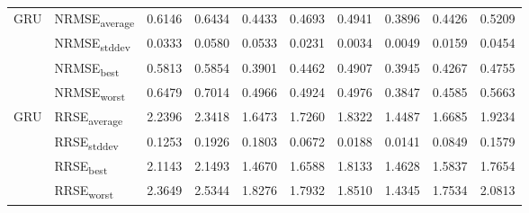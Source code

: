 {\begin{longtable}{l l c c c c c c c c}
\cmidrule(lr){2-10}
\multirow{4}{*}{GRU} & NRMSE\textsubscript{average} & 0.6146 & 0.6434 & 0.4433 & 0.4693 & 0.4941 & 0.3896 & 0.4426 & 0.5209 \\
 & NRMSE\textsubscript{stddev} & 0.0333 & 0.0580 & 0.0533 & 0.0231 & 0.0034 & 0.0049 & 0.0159 & 0.0454 \\
 & NRMSE\textsubscript{best} & 0.5813 & 0.5854 & 0.3901 & 0.4462 & 0.4907 & 0.3945 & 0.4267 & 0.4755 \\
 & NRMSE\textsubscript{worst} & 0.6479 & 0.7014 & 0.4966 & 0.4924 & 0.4976 & 0.3847 & 0.4585 & 0.5663 \\
\cmidrule(lr){2-10}
\multirow{4}{*}{GRU} & RRSE\textsubscript{average} & 2.2396 & 2.3418 & 1.6473 & 1.7260 & 1.8322 & 1.4487 & 1.6685 & 1.9234 \\
 & RRSE\textsubscript{stddev} & 0.1253 & 0.1926 & 0.1803 & 0.0672 & 0.0188 & 0.0141 & 0.0849 & 0.1579 \\
 & RRSE\textsubscript{best} & 2.1143 & 2.1493 & 1.4670 & 1.6588 & 1.8133 & 1.4628 & 1.5837 & 1.7654 \\
 & RRSE\textsubscript{worst} & 2.3649 & 2.5344 & 1.8276 & 1.7932 & 1.8510 & 1.4345 & 1.7534 & 2.0813 \\
\cmidrule(lr){2-10}
\end{longtable}
}